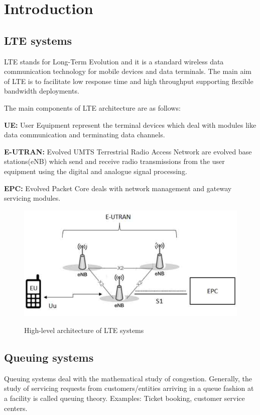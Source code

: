 \chapter{Introduction}

\section{LTE systems}

LTE stands for Long-Term Evolution and it is a standard wireless data communication technology for mobile devices and data terminals.
The main aim of LTE is to facilitate low response time and high throughput supporting flexible bandwidth deployments.

The main components of LTE architecture are as follows:

\textbf{UE:} 
User Equipment represent the terminal devices which deal with modules like data communication and terminating data channels.

\textbf{E-UTRAN:} 
Evolved UMTS Terrestrial Radio Access Network are evolved base stations(eNB) which send and receive radio transmissions from the user equipment using the digital and analogue signal processing.

\textbf{EPC:}
Evolved Packet Core  deals with network management and gateway servicing modules.
\begin{figure}[ht!]
        \centering
        \includegraphics[scale=0.60]{lte_diagram.PNG}
        \\\caption{High-level architecture of LTE systems}
        \label{lte}
\end{figure}


\section{Queuing systems}

Queuing systems deal with the mathematical study of congestion. Generally, the study of servicing requests from customers/entities arriving in a queue fashion at a facility is called queuing theory.
Examples: Ticket booking, customer service centers.

